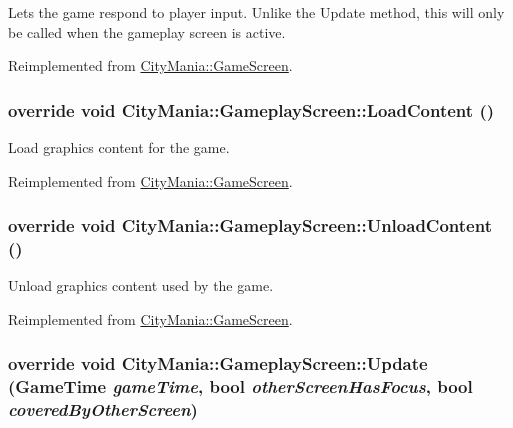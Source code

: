 Lets the game respond to player input. Unlike the Update method, this will only be called when the gameplay screen is active. 

Reimplemented from \hyperlink{classCityMania_1_1GameScreen_a80edab75e121f4e08b007f47206cf29c}{CityMania::GameScreen}.\hypertarget{classCityMania_1_1GameplayScreen_a6bc115541e6000548bf828762044fd46}{
\subsubsection[{LoadContent}]{\setlength{\rightskip}{0pt plus 5cm}override void CityMania::GameplayScreen::LoadContent ()}}
\label{classCityMania_1_1GameplayScreen_a6bc115541e6000548bf828762044fd46}


Load graphics content for the game. 

Reimplemented from \hyperlink{classCityMania_1_1GameScreen_a4dc3798784fff49b20280903d796c94c}{CityMania::GameScreen}.\hypertarget{classCityMania_1_1GameplayScreen_ad61c20401840e56538b55b6ae3704f45}{
\subsubsection[{UnloadContent}]{\setlength{\rightskip}{0pt plus 5cm}override void CityMania::GameplayScreen::UnloadContent ()}}
\label{classCityMania_1_1GameplayScreen_ad61c20401840e56538b55b6ae3704f45}


Unload graphics content used by the game. 

Reimplemented from \hyperlink{classCityMania_1_1GameScreen_a038a86bacf5b7d62141477980312f49b}{CityMania::GameScreen}.\hypertarget{classCityMania_1_1GameplayScreen_a721faf1bb18e20ca09310f3f5240de81}{
\subsubsection[{Update}]{\setlength{\rightskip}{0pt plus 5cm}override void CityMania::GameplayScreen::Update (GameTime {\em gameTime}, \/  bool {\em otherScreenHasFocus}, \/  bool {\em coveredByOtherScreen})}}
\label{classCityMania_1_1GameplayScreen_a721faf1bb18e20ca09310f3f5240de81}


